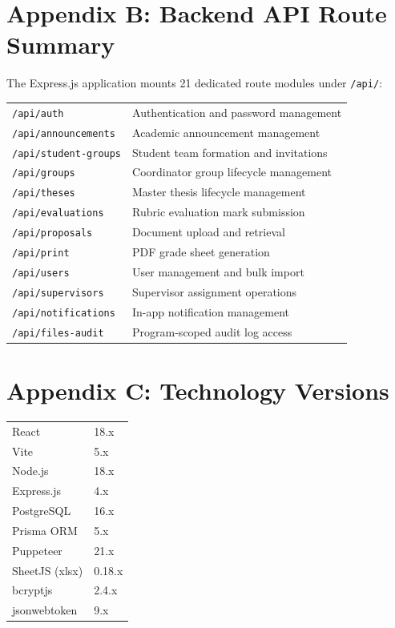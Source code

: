 \documentclass[12pt]{report}
\begin{document}
\section*{Appendix B: Backend API Route Summary}
The Express.js application mounts 21 dedicated route modules under \texttt{/api/}:
\begin{center}
\begin{tabular}{l l}
\texttt{/api/auth} & Authentication and password management \\
\texttt{/api/announcements} & Academic announcement management \\
\texttt{/api/student-groups} & Student team formation and invitations \\
\texttt{/api/groups} & Coordinator group lifecycle management \\
\texttt{/api/theses} & Master thesis lifecycle management \\
\texttt{/api/evaluations} & Rubric evaluation mark submission \\
\texttt{/api/proposals} & Document upload and retrieval \\
\texttt{/api/print} & PDF grade sheet generation \\
\texttt{/api/users} & User management and bulk import \\
\texttt{/api/supervisors} & Supervisor assignment operations \\
\texttt{/api/notifications} & In-app notification management \\
\texttt{/api/files-audit} & Program-scoped audit log access \\
\end{tabular}
\end{center}

\section*{Appendix C: Technology Versions}
\begin{center}
\begin{tabular}{l l}
React & 18.x \\
Vite & 5.x \\
Node.js & 18.x \\
Express.js & 4.x \\
PostgreSQL & 16.x \\
Prisma ORM & 5.x \\
Puppeteer & 21.x \\
SheetJS (xlsx) & 0.18.x \\
bcryptjs & 2.4.x \\
jsonwebtoken & 9.x \\
\end{tabular}
\end{center}
\end{document}
